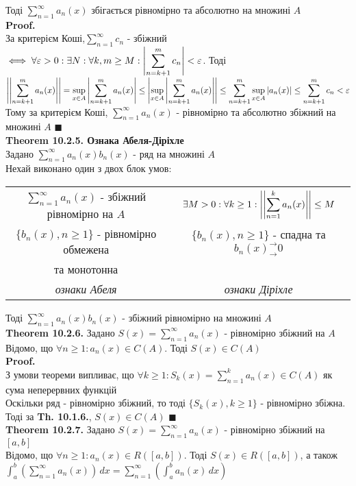 \documentclass[a4paper, 14pt]{extarticle}
\def\huge{\displaystyle}
\def\bigline{\vspace{5mm}\\}
\def\th#1{\textbf{Theorem {#1}}}
\def\proof{\textbf{Proof.}\\}
\def\bigline{\vspace{5mm}\\}
\def\qed{$\blacksquare$}
\begin{document}
Тоді $\huge \sum_{n=1}^\infty a_n(x)$ збігається рівномірно та абсолютно на множині $A$\\
\proof
За критерієм Коші,$\huge \sum_{n=1}^\infty c_n$ - збіжний $\iff \forall \varepsilon > 0: \exists N: \forall k,m \geq M: \huge \abs{\sum_{n=k+1}^m c_n} < \varepsilon$. Тоді\\
$\huge \left| \left| \sum_{n=k+1}^m a_n(x) \right| \right| = \sup_{x \in A} \abs{ \sum_{n=k+1}^m a_n(x)} \leq \abs{ \sup_{x \in A} \abs{ \sum_{n=k+1}^m a_n(x)} } \leq \sum_{n=k+1}^m \sup_{x \in A} |a_n(x)| \leq \sum_{n=k+1}^m c_n < \varepsilon$\\
Тому за критерієм Коші, $\huge \sum_{n=1}^\infty a_n(x)$ - рівномірно та абсолютно збіжний на множині $A$ \qed
\bigline
\th{10.2.5. Ознака Абеля-Діріхле}\\
Задано  $\huge \sum_{n=1}^\infty a_n(x) b_n(x)$ - ряд на множині $A$\\
Нехай виконано один з двох блок умов:\\
\begin{tabular}{c | c}
$\huge \sum_{n=1}^{\infty} a_n(x)$ - збіжний рівномірно на $A$ & $\exists M > 0: \forall k \geq 1: \huge \abs{\abs{\sum_{n=1}^k a_n(x)}} \leq M$ \\
$\{b_n(x), n \geq 1\}$ - рівномірно обмежена & $\{b_n(x), n \geq 1\}$ - спадна та $b_n(x)^\rightarrow_\rightarrow 0$ \\
та монотонна & \\
\textit{ознаки Абеля} & \textit{ознаки Діріхле}
\end{tabular}
Тоді $\huge \sum_{n=1}^{\infty} a_n(x) b_n(x)$ - збіжний рівномірно на множині $A$
\bigline
\th{10.2.6.} Задано $S(x) = \huge \sum_{n=1}^\infty a_n(x)$ - рівномірно збіжний на $A$\\
Відомо, що $\forall n \geq 1: a_n(x) \in C(A)$. Тоді $S(x) \in C(A)$\\
\proof
З умови теореми випливає, що $\forall k \geq 1: S_k(x) = \huge \sum_{n=1}^k a_n(x) \in C(A)$ як сума неперервних функцій\\
Оскільки ряд - рівномірно збіжний, то тоді $\{S_k(x), k \geq 1\}$ - рівномірно збіжна. Тоді за \textbf{Th. 10.1.6.}, $S(x) \in C(A)$ \qed
\bigline
\th{10.2.7.} Задано $S(x) = \huge \sum_{n=1}^\infty a_n(x)$ - рівномірно збіжний на $[a,b]$\\
Відомо, що $\forall n \geq 1: a_n(x) \in R([a,b])$. Тоді $S(x) \in R([a,b])$, а також\\
$\huge \int_a^b \left( \sum_{n=1}^\infty a_n(x) \right) \,dx = \sum_{n=1}^\infty \left( \int_a^b a_n(x)\,dx \right)$\\
\end{document}
